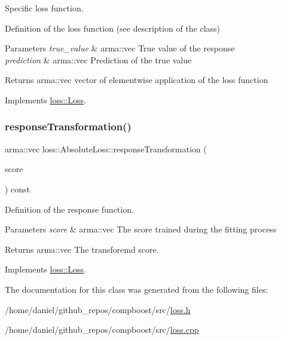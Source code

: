 Specific loss function. 

Definition of the loss function (see description of the class)


\begin{DoxyParams}{Parameters}
{\em true\+\_\+value} & {\ttfamily arma\+::vec} True value of the response \\
\hline
{\em prediction} & {\ttfamily arma\+::vec} Prediction of the true value\\
\hline
\end{DoxyParams}
\begin{DoxyReturn}{Returns}
{\ttfamily arma\+::vec} vector of elementwise application of the loss function 
\end{DoxyReturn}


Implements \hyperlink{classloss_1_1_loss_ae9f94dd9b8311397583ba3a9cb485e94}{loss\+::\+Loss}.

\mbox{\label{classloss_1_1_absolute_loss_aa7e0ac902d905ae97f9e2d0337c6c058}} 
\subsubsection{\texorpdfstring{response\+Transformation()}{responseTransformation()}}
{\footnotesize\ttfamily arma\+::vec loss\+::\+Absolute\+Loss\+::response\+Transformation (\begin{DoxyParamCaption}\item[{const arma\+::vec \&}]{score }\end{DoxyParamCaption}) const\hspace{0.3cm}{\ttfamily [virtual]}}



Definition of the response function. 


\begin{DoxyParams}{Parameters}
{\em score} & {\ttfamily arma\+::vec} The score trained during the fitting process\\
\hline
\end{DoxyParams}
\begin{DoxyReturn}{Returns}
{\ttfamily arma\+::vec} The transforemd score. 
\end{DoxyReturn}


Implements \hyperlink{classloss_1_1_loss_a0a84b7df79b08e40b538aaa7e6ee75c4}{loss\+::\+Loss}.



The documentation for this class was generated from the following files\+:\begin{DoxyCompactItemize}
\item 
/home/daniel/github\+\_\+repos/compboost/src/\hyperlink{loss_8h}{loss.\+h}\item 
/home/daniel/github\+\_\+repos/compboost/src/\hyperlink{loss_8cpp}{loss.\+cpp}\end{DoxyCompactItemize}

